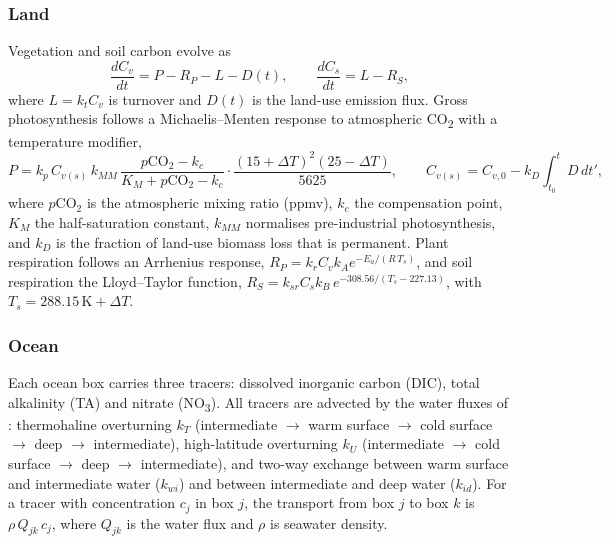 \subsubsection{Land}
Vegetation and soil carbon evolve as
\begin{equation}
\frac{dC_v}{dt} = P - R_P - L - D(t), \qquad \frac{dC_s}{dt} = L - R_S,
\label{eq:land}
\end{equation}
where $L = k_t C_v$ is turnover and $D(t)$ is the land-use emission flux. Gross photosynthesis follows a Michaelis--Menten response to atmospheric CO\textsubscript{2} with a temperature modifier,
\begin{equation}
P = k_p \, C_{v(s)} \, k_{MM}\, \frac{p\text{CO}_2 - k_c}{K_M + p\text{CO}_2 - k_c} \cdot \frac{(15 + \Delta T)^2 (25 - \Delta T)}{5625},
\qquad C_{v(s)} = C_{v,0} - k_D \int_{t_0}^{t} D\,dt',
\label{eq:photosynthesis}
\end{equation}
where $p\text{CO}_2$ is the atmospheric mixing ratio (ppmv), $k_c$ the compensation point, $K_M$ the half-saturation constant, $k_{MM}$ normalises pre-industrial photosynthesis, and $k_D$ is the fraction of land-use biomass loss that is permanent. Plant respiration follows an Arrhenius response, $R_P = k_r C_v k_A e^{-E_a/(R\,T_s)}$, and soil respiration the Lloyd--Taylor function, $R_S = k_{sr} C_s k_B\, e^{-308.56/(T_s - 227.13)}$, with $T_s = 288.15\,\text{K} + \Delta T$.

\subsubsection{Ocean}
Each ocean box carries three tracers: dissolved inorganic carbon (DIC), total alkalinity (TA) and nitrate (NO\textsubscript{3}). All tracers are advected by the water fluxes of \citet[Fig.~1, Table~2]{lentonLandOceanCarbon2000}: thermohaline overturning $k_T$ (intermediate $\to$ warm surface $\to$ cold surface $\to$ deep $\to$ intermediate), high-latitude overturning $k_U$ (intermediate $\to$ cold surface $\to$ deep $\to$ intermediate), and two-way exchange between warm surface and intermediate water ($k_{wi}$) and between intermediate and deep water ($k_{id}$). For a tracer with concentration $c_j$ in box $j$, the transport from box $j$ to box $k$ is $\rho\, Q_{jk}\, c_j$, where $Q_{jk}$ is the water flux and $\rho$ is seawater density.

